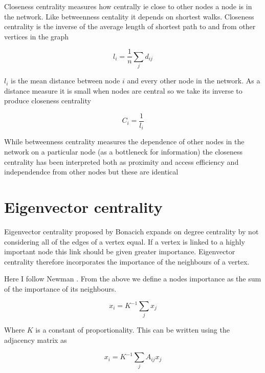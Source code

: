 Closeness centrality measures how centrally ie close to other nodes a node is in the network. Like betweenness centality it depends on shortest walks. Closeness centrality is the inverse of the  average length of shortest path to and from other vertices in the graph \cite{freeman1978centrality}

\begin{equation}
    l_i = \frac{1}{n} \sum_j d_{ij}
\end{equation}

$l_i$ is the mean distance between node $i$ and every other node in the network. As a distance measure it is small when nodes are central so we take its inverse to produce closeness centrality


\begin{equation}
    C_i = \frac{1}{l_i}
\end{equation}

While betweenness centrality measures the dependence of other nodes in the network on a particular node (as a bottleneck for information) the closeness centrality has been interpreted both as proximity and access efficiency and independendce from other nodes  but these are identical



\section{Eigenvector centrality}

Eigenvector centrality proposed by Bonacich \cite{bonacich1972factoring} expands on degree centrality by not considering all of the edges of a vertex equal. If a vertex is linked to a highly important node this link should be given greater importance. Eigenvector centrality therefore incorporates the importance of the neighbours of a vertex.

Here I follow Newman \cite{newman2018networks}. From the above we define a nodes importance as the sum of the importance of its neighbours.

\begin{equation}
    x_i = K^{-1} \sum_j x_j
\end{equation}

Where $K$ is a constant of proportionality. This can be written using the adjacency matrix as

\begin{equation}
    x_i = K^{-1} \sum_j A_{ij} x_j
\end{equation}

